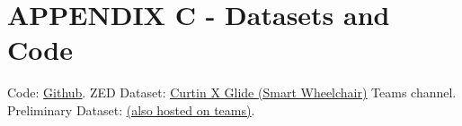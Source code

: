 \section*{APPENDIX C - Datasets and Code}

Code: \href{https://github.com/JakobWyatt/smart-wheelchair}{\underline{Github}}.
ZED Dataset: \href{https://curtin.sharepoint.com/:f:/r/sites/CurtinXGlide/Shared%20Documents/Navigation%20and%20Object%20Detection/ZED?csf=1&web=1&e=tTau9D}{\underline{Curtin X Glide (Smart Wheelchair)}} Teams channel.
Preliminary Dataset: \href{https://curtin.sharepoint.com/:v:/r/sites/CurtinXGlide/Shared%20Documents/Navigation%20and%20Object%20Detection/GoPro%20Dataset.mp4?csf=1&web=1&e=seLdRb}{\underline{(also hosted on teams)}}.
